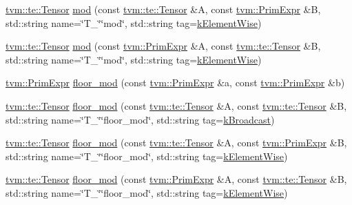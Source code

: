 \begin{DoxyCompactItemize}
\item 
\hyperlink{classtvm_1_1te_1_1Tensor}{tvm\+::te\+::\+Tensor} \hyperlink{namespacetopi_a41c5164cc0d0a150a73f5a08a3ee69de}{mod} (const \hyperlink{classtvm_1_1te_1_1Tensor}{tvm\+::te\+::\+Tensor} \&A, const \hyperlink{classtvm_1_1PrimExpr}{tvm\+::\+Prim\+Expr} \&B, std\+::string name=\char`\"{}T\+\_\+\char`\"{}\char`\"{}mod\char`\"{}, std\+::string tag=\hyperlink{namespacetopi_ac1b34ed59d38a5f5338bee6b2cad42be}{k\+Element\+Wise})
\item 
\hyperlink{classtvm_1_1te_1_1Tensor}{tvm\+::te\+::\+Tensor} \hyperlink{namespacetopi_ad39f0ac84fdb807b897f937ca5c22794}{mod} (const \hyperlink{classtvm_1_1PrimExpr}{tvm\+::\+Prim\+Expr} \&A, const \hyperlink{classtvm_1_1te_1_1Tensor}{tvm\+::te\+::\+Tensor} \&B, std\+::string name=\char`\"{}T\+\_\+\char`\"{}\char`\"{}mod\char`\"{}, std\+::string tag=\hyperlink{namespacetopi_ac1b34ed59d38a5f5338bee6b2cad42be}{k\+Element\+Wise})
\item 
\hyperlink{classtvm_1_1PrimExpr}{tvm\+::\+Prim\+Expr} \hyperlink{namespacetopi_a83fe39f90c5576ae3060e8a5489d2f39}{floor\+\_\+mod} (const \hyperlink{classtvm_1_1PrimExpr}{tvm\+::\+Prim\+Expr} \&a, const \hyperlink{classtvm_1_1PrimExpr}{tvm\+::\+Prim\+Expr} \&b)
\item 
\hyperlink{classtvm_1_1te_1_1Tensor}{tvm\+::te\+::\+Tensor} \hyperlink{namespacetopi_a91e645518d03e0858c6ad492448fabbb}{floor\+\_\+mod} (const \hyperlink{classtvm_1_1te_1_1Tensor}{tvm\+::te\+::\+Tensor} \&A, const \hyperlink{classtvm_1_1te_1_1Tensor}{tvm\+::te\+::\+Tensor} \&B, std\+::string name=\char`\"{}T\+\_\+\char`\"{}\char`\"{}floor\+\_\+mod\char`\"{}, std\+::string tag=\hyperlink{namespacetopi_a794b9155e9ba9d1c9c42a1cff1fb645f}{k\+Broadcast})
\item 
\hyperlink{classtvm_1_1te_1_1Tensor}{tvm\+::te\+::\+Tensor} \hyperlink{namespacetopi_a2f063477e8aec5336ad04608557ebeac}{floor\+\_\+mod} (const \hyperlink{classtvm_1_1te_1_1Tensor}{tvm\+::te\+::\+Tensor} \&A, const \hyperlink{classtvm_1_1PrimExpr}{tvm\+::\+Prim\+Expr} \&B, std\+::string name=\char`\"{}T\+\_\+\char`\"{}\char`\"{}floor\+\_\+mod\char`\"{}, std\+::string tag=\hyperlink{namespacetopi_ac1b34ed59d38a5f5338bee6b2cad42be}{k\+Element\+Wise})
\item 
\hyperlink{classtvm_1_1te_1_1Tensor}{tvm\+::te\+::\+Tensor} \hyperlink{namespacetopi_ae25ae66b5fc09f84349cd19408f7c9e3}{floor\+\_\+mod} (const \hyperlink{classtvm_1_1PrimExpr}{tvm\+::\+Prim\+Expr} \&A, const \hyperlink{classtvm_1_1te_1_1Tensor}{tvm\+::te\+::\+Tensor} \&B, std\+::string name=\char`\"{}T\+\_\+\char`\"{}\char`\"{}floor\+\_\+mod\char`\"{}, std\+::string tag=\hyperlink{namespacetopi_ac1b34ed59d38a5f5338bee6b2cad42be}{k\+Element\+Wise})

\end{DoxyCompactItemize}
